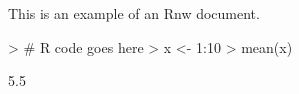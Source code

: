 \documentclass{article}
\begin{document}


This is an example of an Rnw document.

\begin{Schunk}
\begin{Sinput}
> # R code goes here
> x <- 1:10
> mean(x)
\end{Sinput}
\begin{Soutput}
[1] 5.5
\end{Soutput}
\end{Schunk}
\end{document}
